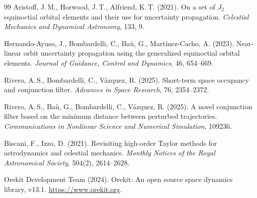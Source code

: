 \documentclass[11pt]{article}
\begin{document}
\begin{thebibliography}{99}
Aristoff, J.\,M., Horwood, J.\,T., Alfriend, K.\,T. (2021).
On a set of $J_2$ equinoctial orbital elements and their use for
uncertainty propagation.
\textit{Celestial Mechanics and Dynamical Astronomy}, 133, 9.

Hernando-Ayuso, J., Bombardelli, C., Ba\`u, G., Mart\'inez-Cacho, A. (2023).
Near-linear orbit uncertainty propagation using the generalized equinoctial
orbital elements.
\textit{Journal of Guidance, Control and Dynamics}, 46, 654--669.


Rivero, A.\,S., Bombardelli, C., V\'azquez, R. (2025).
Short-term space occupancy and conjunction filter.
\textit{Advances in Space Research}, 76, 2354--2372.

Rivero, A.\,S., Ba\`u, G., Bombardelli, C., V\'azquez, R. (2025).
A novel conjunction filter based on the minimum distance between
perturbed trajectories.
\textit{Communications in Nonlinear Science and Numerical Simulation},
109236.


Biscani, F., Izzo, D. (2021).
Revisiting high-order Taylor methods for astrodynamics and celestial
mechanics.
\textit{Monthly Notices of the Royal Astronomical Society}, 504(2),
2614--2628.


Orekit Development Team (2024).
Orekit: An open source space dynamics library, v13.1.
\url{https://www.orekit.org}.

\end{thebibliography}
\end{document}
